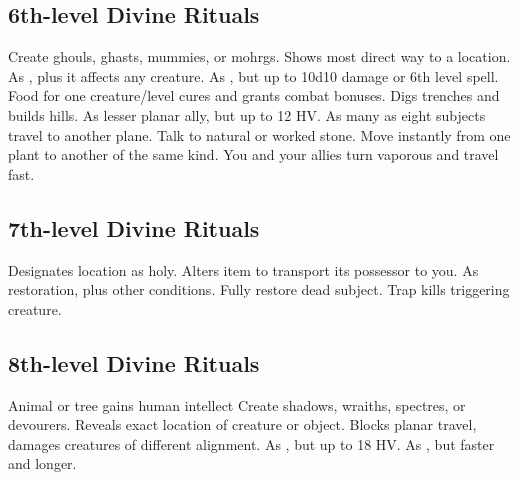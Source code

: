 \subsection{6th-level Divine Rituals}
\begin{rituallist}
   Create ghouls, ghasts, mummies, or mohrgs.
   Shows most direct way to a location.
   As , plus it affects any creature.
   As , but up to 10d10 damage or 6th level spell.
   Food for one creature/level cures and grants combat bonuses.
   Digs trenches and builds hills.
   As lesser planar ally, but up to 12 HV.
  \F As many as eight subjects travel to another plane.
   Talk to natural or worked stone.
   Move instantly from one plant to another of the same kind.
   You and your allies turn vaporous and travel fast.
\end{rituallist}

\subsection{7th-level Divine Rituals}
\begin{rituallist}
   Designates location as holy.
   Alters item to transport its possessor to you.
   As restoration, plus other conditions.
   Fully restore dead subject.
   Trap kills triggering creature.
\end{rituallist}

\subsection{8th-level Divine Rituals}
\begin{rituallist}
   Animal or tree gains human intellect
   Create shadows, wraiths, spectres, or devourers.
   Reveals exact location of creature or object.
   Blocks planar travel, damages creatures of different alignment.
   As , but up to 18 HV.
   As , but faster and longer.
\end{rituallist}

